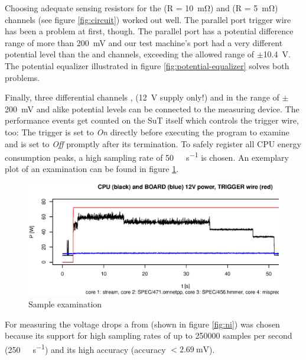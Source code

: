 Choosing adequate sensing resistors for the  (R =
\SI{10}{\milli\ohm}) and  (R = \SI{5}{\milli\ohm}) channels (see
figure \ref{fig:circuit}) worked out well. The parallel port trigger wire has
been a problem at first, though. The parallel port has a potential difference
range of more than \SI{200}{\milli\volt} and our test machine's port had a very
different potential level than the  and  channels,
exceeding the allowed range of $\pm$\SI{10.4}{\volt}.  The potential equalizer
illustrated in figure \ref{fig:potential-equalizer} solves both problems.

Finally, three differential channels , 
(\SI{12}{\volt} supply only!) and  in the range of
$\pm$\SI{200}{\milli\volt} and alike potential levels can be connected to the
measuring device. The performance events get counted on the SuT itself which
controls the trigger wire, too: The trigger is set to \emph{On} directly before
executing the program to examine and is set to \emph{Off} promptly after its
termination. To safely register all CPU energy consumption peaks, a high
sampling rate of \SI{50}{\kilo\samples\per\second} is chosen. An exemplary
plot of an examination can be found in figure \ref{fig:cpu-power-trig}.

\begin{figure}
  \centering
    \includegraphics[width=\textwidth]{fig/cpu-power-trig.eps}
  \caption{Sample examination}
  \label{fig:cpu-power-trig}
\end{figure}


\label{sec:measuring-device}

For measuring the voltage drops a \JWPLni{} from
 (shown in figure
\ref{fig:ni}) was chosen because its support for high sampling rates of up to
250000 samples per second (\SI{250}{\kilo\samples\per\second}) and its high
accuracy (accuracy $< \SI{2.69}{\milli\volt}$)\cite{NISpec2009}.

